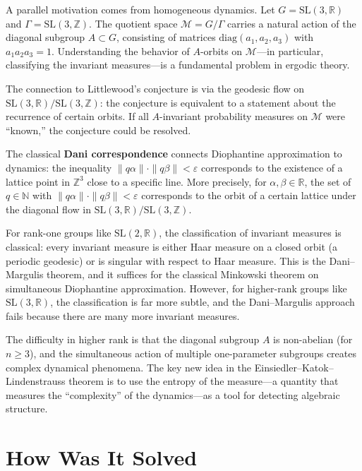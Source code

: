 A parallel motivation comes from homogeneous dynamics. Let $G = \text{SL}(3,\mathbb{R})$ and $\Gamma = \text{SL}(3,\mathbb{Z})$. The quotient space $\mathcal{M} = G/\Gamma$ carries a natural action of the diagonal subgroup $A \subset G$, consisting of matrices $\text{diag}(a_1, a_2, a_3)$ with $a_1 a_2 a_3 = 1$. Understanding the behavior of $A$-orbits on $\mathcal{M}$---in particular, classifying the invariant measures---is a fundamental problem in ergodic theory.

The connection to Littlewood's conjecture is via the geodesic flow on $\text{SL}(3,\mathbb{R})/\text{SL}(3,\mathbb{Z})$: the conjecture is equivalent to a statement about the recurrence of certain orbits. If all $A$-invariant probability measures on $\mathcal{M}$ were ``known,'' the conjecture could be resolved.

The classical \textbf{Dani correspondence} connects Diophantine approximation to dynamics: the inequality $\|q\alpha\| \cdot \|q\beta\| < \varepsilon$ corresponds to the existence of a lattice point in $\mathbb{Z}^3$ close to a specific line. More precisely, for $\alpha, \beta \in \mathbb{R}$, the set of $q \in \mathbb{N}$ with $\|q\alpha\| \cdot \|q\beta\| < \varepsilon$ corresponds to the orbit of a certain lattice under the diagonal flow in $\text{SL}(3,\mathbb{R})/\text{SL}(3,\mathbb{Z})$.

For rank-one groups like $\text{SL}(2,\mathbb{R})$, the classification of invariant measures is classical: every invariant measure is either Haar measure on a closed orbit (a periodic geodesic) or is singular with respect to Haar measure. This is the Dani--Margulis theorem, and it suffices for the classical Minkowski theorem on simultaneous Diophantine approximation. However, for higher-rank groups like $\text{SL}(3,\mathbb{R})$, the classification is far more subtle, and the Dani--Margulis approach fails because there are many more invariant measures.

The difficulty in higher rank is that the diagonal subgroup $A$ is non-abelian (for $n \ge 3$), and the simultaneous action of multiple one-parameter subgroups creates complex dynamical phenomena. The key new idea in the Einsiedler--Katok--Lindenstrauss theorem is to use the entropy of the measure---a quantity that measures the ``complexity'' of the dynamics---as a tool for detecting algebraic structure.

\section{How Was It Solved}\label{ch2010elonlindenstrauss:how-was-it-solved}

